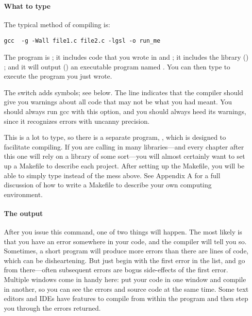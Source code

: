 \paragraph{What to type}
The typical method of compiling is:
\begin{lstlisting}
gcc  -g -Wall file1.c file2.c -lgsl -o run_me
\end{lstlisting}
The program is ; it includes code that you wrote in
 and ; it includes the library
() ;
and it will output () an executable program named . You
can then type  to execute the program you just wrote.

The  switch adds  symbols; see below.  The
 line indicates that the compiler should give you warnings
about all code that may not be what you had meant. You should always run
gcc with this option, and you should always heed its warnings, since it
recognizes errors with uncanny precision.

This is a lot to type, so there is a separate program, ,
which is designed to facilitate compiling. If you are calling in many
libraries---and every chapter after this one will rely on a library of
some sort---you will almost certainly want to set up a Makefile to
describe each project. After setting up the Makefile, you will be able
to simply type  instead of the mess above. See Appendix A
for a full discussion of how to write a Makefile to describe your own
computing environment.


\paragraph{The output} After you issue this command, one of two things
will happen. The most likely is that you have an error somewhere in your
code, and the compiler will tell you so. Sometimes, a short program
will produce more errors than there are lines of code, which can be
disheartening. But just begin with the first error in the list, and go
from there---often subsequent errors are bogus side-effects of the first
error. Multiple windows come in handy here: put your code in one window
and compile in another, so you can see the errors and source code at
the same time. Some text editors and IDEs have features to compile from
within the program and then step you through the errors returned.

